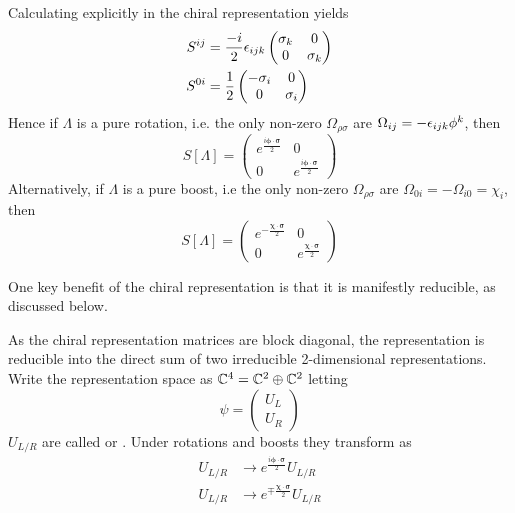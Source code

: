 \documentclass{article}
\begin{document}
\begin{example}
Calculating explicitly in the chiral representation yields 
\begin{align*}
    S^{ij} &= \frac{-i}{2}\epsilon_{ijk} \begin{pmatrix} \sigma_k & 0 \\ 0 & \sigma_k \end{pmatrix} \\
    S^{0i} &= \frac{1}{2} \begin{pmatrix} -\sigma_i & 0 \\ 0 & \sigma_i \end{pmatrix}
\end{align*}
Hence if $\Lambda$ is a pure rotation, i.e. the only non-zero $\Omega_{\rho\sigma}$ are $\Omega_{ij}=-\epsilon_{ijk}\phi^k$, then 
\[
S[\Lambda]=\begin{pmatrix} e^{\frac{i\bm{\phi}\cdot\bm{\sigma}}{2}} & 0 \\ 0 & e^{\frac{i\bm{\phi}\cdot\bm{\sigma}}{2}} \end{pmatrix}
\]
Alternatively, if $\Lambda$ is a pure boost, i.e the only non-zero $\Omega_{\rho\sigma}$ are $\Omega_{0i}=-\Omega_{i0}=\chi_i$, then
\[
S[\Lambda]=\begin{pmatrix} e^{-\frac{\bm{\chi}\cdot\bm{\sigma}}{2}} & 0 \\ 0 & e^\frac{\bm{\chi}\cdot\bm{\sigma}}{2} \end{pmatrix}
\]
\end{example}

\begin{idea}
One key benefit of the chiral representation is that it is manifestly reducible, as discussed below.
\end{idea}

\begin{definition}
As the chiral representation matrices are block diagonal, the representation is reducible into the direct sum of two irreducible 2-dimensional representations. Write the representation space as $\mathbb{C}^4=\mathbb{C}^2\oplus\mathbb{C}^2$ letting 
\[
\psi=\begin{pmatrix} U_L \\ U_R \end{pmatrix}
\]
$U_{L/R}$ are called  or . Under rotations and boosts they transform as 
\begin{align*}
    U_{L/R} &\to e^{\frac{i\bm{\phi}\cdot\bm{\sigma}}{2}} U_{L/R} \\ 
    U_{L/R} &\to e^{\mp\frac{\bm{\chi}\cdot\bm{\sigma}}{2}} U_{L/R}
\end{align*}
\end{definition}
\end{document}
